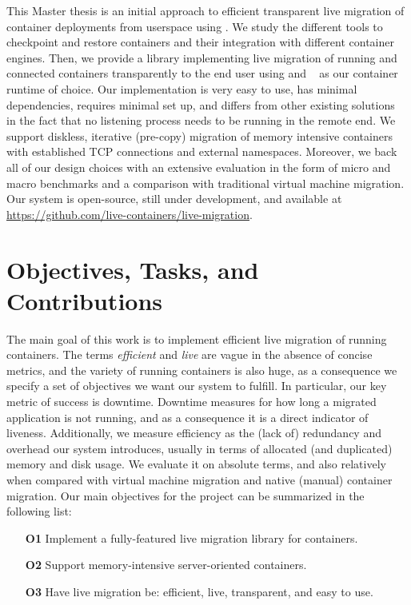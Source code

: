 This Master thesis is an initial approach to efficient transparent live migration of container deployments from userspace using \criu.
We study the different tools to checkpoint and restore containers and their integration with different container engines.
Then, we provide a library implementing live migration of running and connected containers transparently to the end user using \criu and \runc~\cite{introducing-runc} as our container runtime of choice.
Our implementation is very easy to use, has minimal dependencies, requires minimal set up, and differs from other existing solutions~\cite{phaul-github} in the fact that no listening process needs to be running in the remote end.
We support diskless, iterative (pre-copy) migration of memory intensive containers with established TCP connections and external namespaces.
Moreover, we back all of our design choices with an extensive evaluation in the form of micro and macro benchmarks and a comparison with traditional virtual machine migration.
Our system is open-source, still under development, and available at \url{https://github.com/live-containers/live-migration}.

\section{Objectives, Tasks, and Contributions}

The main goal of this work is to implement efficient live migration of running containers.
The terms \textit{efficient} and \textit{live} are vague in the absence of concise metrics, and the variety of running containers is also huge, as a consequence we specify a set of objectives we want our system to fulfill.
In particular, our key metric of success is downtime.
Downtime measures for how long a migrated application is not running, and as a consequence it is a direct indicator of liveness.
Additionally, we measure efficiency as the (lack of) redundancy and overhead our system introduces, usually in terms of allocated (and duplicated) memory and disk usage.
We evaluate it on absolute terms, and also relatively when compared with virtual machine migration and native (manual) container migration.
Our main objectives for the project can be summarized in the following list:
\begin{itemize}
    \item[\textbf{O1}] Implement a fully-featured live migration library for containers.
    \item[\textbf{O2}] Support memory-intensive server-oriented containers.
    \item[\textbf{O3}] Have live migration be: efficient, live, transparent, and easy to use.
\end{itemize}

